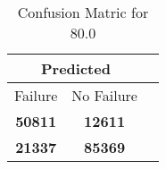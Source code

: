 \begin{table}[] 
\caption{Confusion Matric for 80.0} 
\label{Table: Prediction Accuracy-None80.0DecisionTrees100EKF-ignoresolarPanelDipole-solarPanelDipole} 
\centering 
\begin{tabular} 
 {@{}ccc@{}} 
\toprule 
\multicolumn{2}{c}{\textbf{Predicted}}
 \\ \midrule 
\multicolumn{1}{|c|}{Failure} & 
\multicolumn{1}{c|}{No Failure}
 \\ \midrule 
\multicolumn{1}{|c|}{\color{green}\textbf{50811}} & 
\multicolumn{1}{c|}{\color{red}\textbf{12611}}
 \\ \midrule 
\multicolumn{1}{|c|}{\color{red}\textbf{21337}} & 
\multicolumn{1}{c|}{\color{green}\textbf{85369}}
 \\ \bottomrule 
\end{tabular} 
\end{table} 
